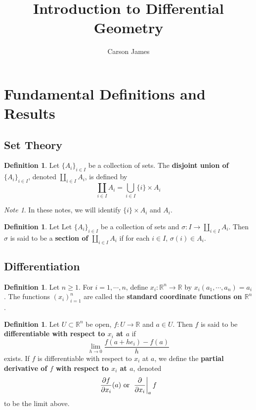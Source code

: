 \documentclass[12pt]{amsart}
\theoremstyle{definition}
\newtheorem{defn}[definition]{Definition}
\theoremstyle{remark}
\newtheorem{note}[remark]{Note}
\theoremstyle{definition}
\newcommand{\sig}{\sigma}
\newcommand{\R}{\mathbb{R}}
\begin{document}
	
	\title{Introduction to Differential Geometry}
	\author{Carson James}
	\maketitle
	
	\tableofcontents
	
	\section{Fundamental Definitions and Results}

	\subsection{Set Theory}
	
	\begin{defn}
		Let $\{A_i\}_{i \in I}$ be a collection of sets. The \textbf{disjoint union of} $\{A_i\}_{i \in I}$, denoted $\coprod\limits_{i \in I} A_i$, is defined by $$\coprod_{i \in I}A_i = \bigcup_{i\in I} \{i\} \times A_i$$ 
	\end{defn}

	\begin{note}
		In these notes, we will identify $\{i\} \times A_i$ and $A_i$.
	\end{note}

	\begin{defn}
		Let Let $\{A_i\}_{i \in I}$ be a collection of sets and $\sig: I \rightarrow \coprod\limits_{i \in I} A_i$. Then $\sig$ is said to be a \textbf{section of $\coprod\limits_{i \in I} A_i$} if for each $i \in I$, $\sig(i) \in A_i$.
	\end{defn}
	
	\subsection{Differentiation}
	
	\begin{defn}
		Let $n \geq 1$. For $i = 1, \cdots, n$, define $x_i: \R^n \rightarrow \R$ by $x_i(a_1, \cdots, a_n) = a_i$. The functions $(x_i)_{i=1}^n$ are called the \textbf{standard coordinate functions on $\R^n$}. 
	\end{defn}
	
	\begin{defn} 
		Let $U \subset \R^n$ be open, $f: U \rightarrow \R$ and $a \in U$. Then $f$ is said to be \textbf{differentiable with respect to $x_i$ at $a$} if $$\lim\limits_{h \rightarrow 0} \frac{f(a + he_i) - f(a)}{h}$$ exists. If $f$ is differentiable with respect to $x_i$ at $a$, we define the \textbf{partial derivative of $f$ with respect to $x_i$ at $a$}, denoted $$\frac{\partial f}{\partial x_i} (a) \text{ or } \eval{\pdv{x_i}}_{a} f $$ to be the limit above.
		
	\end{defn}
		
\end{document}
